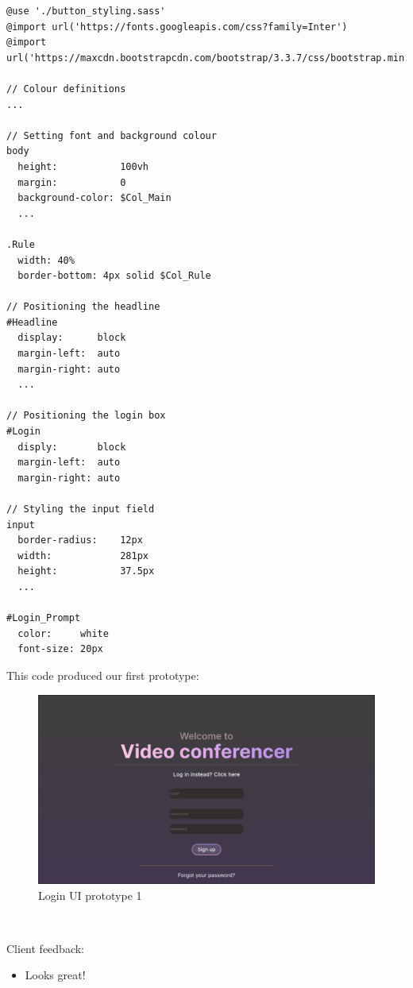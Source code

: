 \begin{verbatim}
@use './button_styling.sass'
@import url('https://fonts.googleapis.com/css?family=Inter')
@import url('https://maxcdn.bootstrapcdn.com/bootstrap/3.3.7/css/bootstrap.min.css')

// Colour definitions
...

// Setting font and background colour
body
  height:           100vh
  margin:           0
  background-color: $Col_Main
  ...

.Rule
  width: 40%
  border-bottom: 4px solid $Col_Rule

// Positioning the headline
#Headline
  display:      block
  margin-left:  auto
  margin-right: auto
  ... 

// Positioning the login box
#Login
  disply:       block
  margin-left:  auto
  margin-right: auto

// Styling the input field
input 
  border-radius:    12px
  width:            281px
  height:           37.5px
  ...

#Login_Prompt
  color:     white
  font-size: 20px
\end{verbatim}

This code produced our first prototype:

\begin{figure}[H]
  \centering
  \includegraphics[scale=0.2]{Images/LoginUI.png}
  \caption{Login UI prototype 1}
\end{figure}

{\color{gray} \hrulefill} \\ \vspace{0.2cm}

{\sffamily Client feedback:}

\begin{itemize}
  \item Looks great!
\end{itemize}

